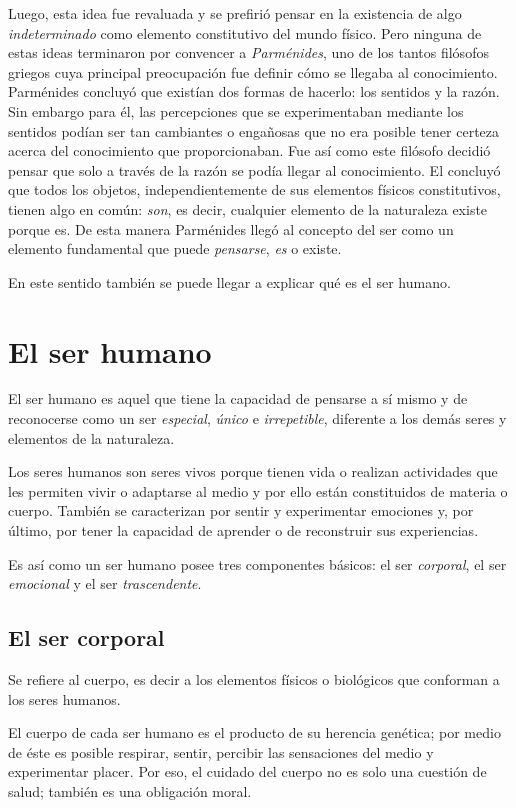 \documentclass[twoside]{article}
\begin{document}
Luego, esta idea fue revaluada y se prefirió pensar en la
existencia de algo \emph{indeterminado} como elemento constitutivo del mundo físico. Pero ninguna de estas ideas terminaron por convencer a \emph{Parménides}, uno de los tantos filósofos griegos cuya principal preocupación fue definir cómo se llegaba al conocimiento. Parménides concluyó que existían dos formas de hacerlo: los sentidos y la razón. Sin embargo para él, las percepciones que se experimentaban mediante los sentidos podían ser tan cambiantes o engañosas que no era posible tener certeza acerca del conocimiento que proporcionaban. Fue así como este filósofo decidió pensar que solo a través de la razón se podía llegar al conocimiento. El concluyó que todos los objetos, independientemente de sus elementos físicos constitutivos, tienen algo en común: \emph{son}, es decir, cualquier elemento de la naturaleza existe porque es. De esta manera Parménides llegó al concepto del ser como un elemento fundamental que puede \emph{pensarse}, \emph{es} o existe.

En este sentido también se puede llegar a explicar qué es
el ser humano.
\section*{El ser humano}
El ser humano es aquel que tiene la capacidad de pensarse
a sí mismo y de reconocerse como un ser \emph{especial}, \emph{único} e \emph{irrepetible}, diferente a los demás seres y elementos de la naturaleza.

Los seres humanos son seres vivos porque tienen vida
o realizan actividades que les permiten vivir o adaptarse al medio y por ello están constituidos de materia o cuerpo. También se caracterizan por sentir y experimentar emociones y, por último, por tener la capacidad de aprender o de reconstruir sus experiencias.

Es así como un ser humano posee tres componentes básicos: el ser \emph{corporal}, el ser \emph{emocional} y el ser \emph{trascendente}.
\subsection*{El ser corporal}
Se refiere al cuerpo, es decir a los elementos físicos o biológicos que conforman a los seres humanos.

El cuerpo de cada ser humano es el producto de su herencia genética; por medio de éste es posible respirar, sentir, percibir las sensaciones del medio y experimentar placer. Por eso, el cuidado del cuerpo no es solo una cuestión de salud; también es una obligación moral.
\end{document}
